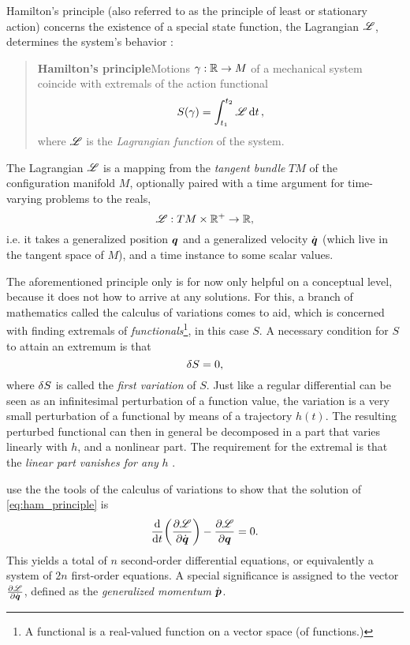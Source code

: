 Hamilton's principle (also referred to as the principle of least or stationary action) concerns the existence of a special state function, the Lagrangian $\mathscr{L}$, determines the system's behavior \cite{Arnold1989}:
\begin{quote}
    \textbf{Hamilton's principle}\qquad Motions $\gamma: 
    \mathbb{R} \to M$ of a mechanical system coincide with extremals of the action functional
    \begin{equation}
        S(\gamma) = \int_{t_1}^{t_2} \mathscr{L} \dd{t},
        \label{eq:ham_principle}
    \end{equation}
    where $\mathscr{L}$ is the \emph{Lagrangian function} of the system.
\end{quote}
The Lagrangian \(\mathscr{L}\) is a mapping from the \emph{tangent bundle} \(TM\) of the configuration manifold \(M\), optionally paired with a time argument for time-varying problems to the reals,
    \[ \mathscr{L} : TM \times \mathbb{R}^+ \to \mathbb{R}, \]
i.e. it takes a generalized position \(\vb*{q}\) and a generalized velocity \(\dot{\vb*{q}}\) (which live in the tangent space of \(M\)), and a time instance to some scalar values.

The aforementioned principle only is for now only helpful on a conceptual level, because it does not how to arrive at any solutions. For this, a branch of mathematics called the calculus of variations comes to aid, which is concerned with finding extremals of \emph{functionals}\footnote{A functional is a real-valued function on a vector space (of functions.)}, in this case \(S\). A necessary condition for \(S\) to attain an extremum is that 
\[ \var{S} = 0,\]
where \(\var{S}\) is called the \emph{first variation} of \(S\). Just like a regular differential can be seen as an infinitesimal perturbation of a function value, the variation is a very small perturbation of a functional by means of a trajectory \(h(t)\). The resulting perturbed functional can then in general be decomposed in a part that varies linearly with \(h\), and a nonlinear part. The requirement for the extremal is that the \emph{linear part vanishes for any} \(h\) \cite{Arnold1989}.

\citet{Landau1960} use the the tools of the calculus of variations to show that the solution of \cref{eq:ham_principle} is
\[ \dv{}{t}\qty(\pdv{\ensuremath{\mathscr{L}}}{\ensuremath{\dot{\vb*{q}}}}) - \pdv{\ensuremath{\mathscr{L}}}{\ensuremath{\vb*{q}}} = 0. \]
This yields a total of \(n\) second-order differential equations, or equivalently a system of \(2n\) first-order equations. A special significance is assigned to the vector $\pdv{\ensuremath{\mathscr{L}}}{\ensuremath{\dot{\vb*{q}}}}$, defined as the \emph{generalized momentum} $\dot{\vb*{p}}$.

